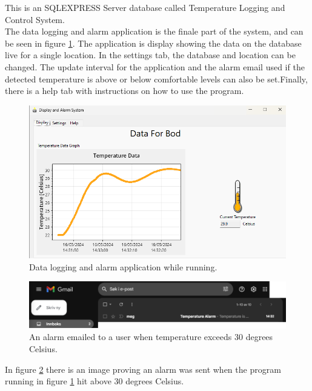 \documentclass[11pt, A4paper, english]{article}
\numberwithin{equation}{section}
\begin{document}
\begin{multicols}{2}
This is an SQLEXPRESS Server database called Temperature Logging and Control System. \\
The data logging and alarm application is the finale part of the system, and can be seen in figure \ref{fig:display-and-alarm-system}. The application is display showing the data on the database live for a single location. In the settings tab, the database and location can be changed. The update interval for the application and the alarm email used if the detected temperature is above or below comfortable levels can also be set.Finally, there is a help tab with instructions on how to use the program.
				\begin{figure}[H]
\includegraphics[width=\columnwidth]{Display and Alarm System.png}
\caption{Data logging and alarm application while running.}
\label{fig:display-and-alarm-system}
				\end{figure}
				\begin{figure}[H]
\includegraphics[width=\columnwidth]{Alarm.png}
\caption{An alarm emailed to a user when temperature exceeds 30 degrees Celsius.}
\label{fig:alarm}
				\end{figure}
In figure \ref{fig:alarm} there is an image proving an alarm was sent when the program running in figure \ref{fig:display-and-alarm-system} hit above 30 degrees Celsius. \\


\end{multicols}
\end{document}
